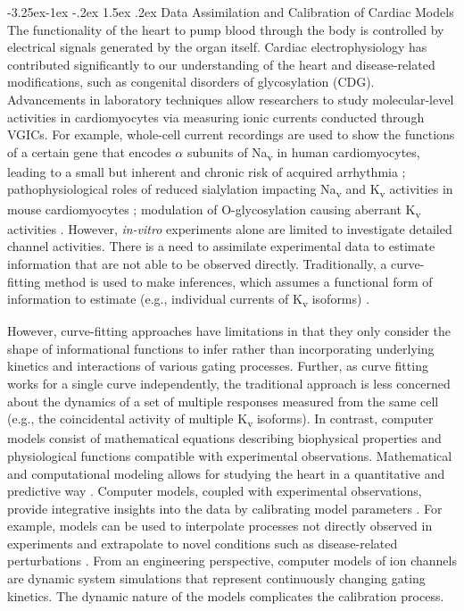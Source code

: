 \documentclass[11pt]{article}
\makeatletter
\renewcommand\subsection{\@startsection{subsection}{2}{\z@}%
                                     {-3.25ex\@plus -1ex \@minus -.2ex}%
                                     {1.5ex \@plus .2ex}%
                                     {\normalfont\fontfamily{phv}\fontsize{14}{17}\bfseries}}
\makeatother
\begin{document}
\subsection{Data Assimilation and Calibration of Cardiac Models}
The functionality of the heart to pump blood through the body is controlled by electrical signals generated by the organ itself. Cardiac electrophysiology has contributed significantly to our understanding of the heart and disease-related modifications, such as congenital disorders of glycosylation (CDG). Advancements in laboratory techniques allow researchers to study molecular-level activities in cardiomyocytes via measuring ionic currents conducted through VGICs. For example, whole-cell current recordings are used to show the functions of a certain gene that encodes $\alpha$ subunits of Na\textsubscript{v} in human cardiomyocytes, leading to a small but inherent and chronic risk of acquired arrhythmia \citep{splawski2002variant}; pathophysiological roles of reduced sialylation impacting Na\textsubscript{v} and K\textsubscript{v} activities in mouse cardiomyocytes \citep{ednie2015sialicNav2, ednie2015sialicKv}; modulation of O-glycosylation causing aberrant K\textsubscript{v} activities \citep{schwetz2011sialic}. However, \textit{in-vitro} experiments alone are limited to investigate detailed channel activities. There is a need to assimilate experimental data to estimate information that are not able to be observed directly. Traditionally, a curve-fitting method is used to make inferences, which assumes a functional form of information to estimate (e.g., individual currents of K\textsubscript{v} isoforms) \citep{liu2011dissection}.

However, curve-fitting approaches have limitations in that they only consider the shape of informational functions to infer rather than incorporating underlying kinetics and interactions of various gating processes. Further, as curve fitting works for a single curve independently, the traditional approach is less concerned about the dynamics of a set of multiple responses measured from the same cell (e.g., the coincidental activity of multiple K\textsubscript{v} isoforms). In contrast, computer models consist of mathematical equations describing biophysical properties and physiological functions compatible with experimental observations. Mathematical and computational modeling allows for studying the heart in a quantitative and predictive way \citep{whittaker2020calibration}. Computer models, coupled with experimental observations, provide integrative insights into the data by calibrating model parameters \citep{winslow2011integrative}. For example, models can be used to interpolate processes not directly observed in experiments and extrapolate to novel conditions such as disease-related perturbations \citep{rodriguez2010systems}. From an engineering perspective, computer models of ion channels are dynamic system simulations that represent continuously changing gating kinetics. The dynamic nature of the models complicates the calibration process.
\end{document}
